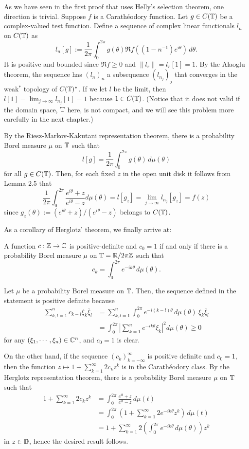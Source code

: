 \documentclass[a4paper]{article}
\begin{document}
\begin{pf}
As we have seen in the first proof that uses Helly's selection theorem, one direction is trivial.
Suppose $f$ is a Carath\'eodory function.
Let $g\in C(\mathbb{T})$ be a complex-valued test function.
Define a sequence of complex linear functionals $l_n$ on $C(\mathbb{T})$ as
\[l_n[g]:=\frac1{2\pi}\int_0^{2\pi}g(\theta)\Re f((1-n^{-1})e^{i\theta})\,d\theta.\]
It is positive and bounded since $\Re f\ge0$ and $\|l_r\|=l_r[1]=1$.
By the Alaoglu theorem, the sequence has $(l_n)_n$ a subsequence $(l_{n_j})_j$ that converges in the weak$^*$ topology of $C(\mathbb{T})^*$.
If we let $l$ be the limit, then $l[1]=\lim_{j\to\infty}l_{n_j}[1]=1$ because $1\in C(\mathbb{T})$.
(Notice that it does not valid if the domain space, $\mathbb{T}$ here, is not compact, and we will see this problem more carefully in the next chapter.)

By the Riesz-Markov-Kakutani representation theorem, there is a probability Borel measure $\mu$ on $\mathbb{T}$ such that
\[l[g]=\frac1{2\pi}\int_0^{2\pi}g(\theta)\,d\mu(\theta)\]
for all $g\in C(\mathbb{T})$.
Then, for each fixed $z$ in the open unit disk it follows from Lemma 2.5 that
\[\frac1{2\pi}\int_0^{2\pi}\frac{e^{i\theta}+z}{e^{i\theta}-z}d\mu(\theta)=l[g_z]=\lim_{j\to\infty}l_{n_j}[g_z]=f(z)\]
since $g_z(\theta):=(e^{i\theta}+z)/(e^{i\theta}-z)$ belongs to $C(\mathbb{T})$.
\end{pf}

As a corollary of Herglotz' theorem, we finally arrive at:

\begin{cor}
A function $c:\mathbb{Z}\to\mathbb{C}$ is positive-definite and $c_0=1$ if and only if there is a probability Borel measure $\mu$ on $\mathbb{T}=\mathbb{R}/2\pi\mathbb{Z}$ such that
\[c_k=\int_0^{2\pi}e^{-ik\theta}\,d\mu(\theta).\]
\end{cor}
\begin{pf}
Let $\mu$ be a probability Borel measure on $\mathbb{T}$.
Then, the sequence defined in the statement is positive definite because
\begin{align*}
\sum_{k,l=1}^nc_{k-l}\xi_k\bar\xi_l
&=\sum_{k,l=1}^n\int_0^{2\pi}e^{-i(k-l)\theta}\,d\mu(\theta)\ \xi_k\bar\xi_l\\
&=\int_0^{2\pi}\left|\sum_{k=1}^ne^{-ik\theta}\xi_k\right|^2d\mu(\theta)\ge0
\end{align*}
for any $(\xi_1,\cdots,\xi_n)\in\mathbb{C}^n$, and $c_0=1$ is clear.

On the other hand, if the sequence $(c_k)_{k=-\infty}^\infty$ is positive definite and $c_0=1$, then the function $z\mapsto1+\sum_{k=1}^\infty2c_kz^k$ is in the Carath\'eodory class.
By the Herglotz representation theorem, there is a probability Borel measure $\mu$ on $\mathbb{T}$ such that
\begin{align*}
1+\sum_{k=1}^\infty2c_kz^k
&=\int_0^{2\pi}\frac{e^{it}+z}{e^{it}-z}\,d\mu(t)\\
&=\int_0^{2\pi}\left(1+\sum_{k=1}^\infty2e^{-ik\theta}z^k\right)\,d\mu(t)\\
&=1+\sum_{k=1}^\infty2\left(\int_0^{2\pi}e^{-ik\theta}\,d\mu(\theta)\right)z^k
\end{align*}
in $z\in\mathbb{D}$, hence the desired result follows.
\end{pf}
\end{document}
